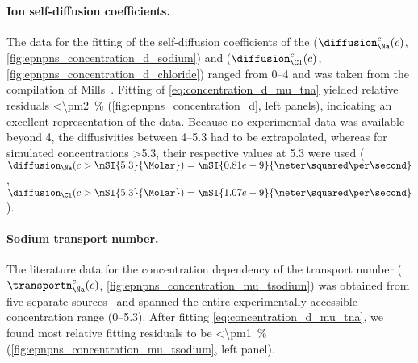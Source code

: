 \paragraph{Ion self-diffusion coefficients.}
%
The data for the fitting of the self-diffusion coefficients of the \Na{} ($\diffusion_{\Na}^c (c)$,
\cref{fig:epnpns_concentration_d_sodium}) and \Cl{} ($\diffusion_{\Cl}^c (c)$,
\cref{fig:epnpns_concentration_d_chloride}) ranged from \SIrange{0}{4}{\Molar} and was taken from the
compilation of Mills~\cite{Mills-1989}. Fitting of \cref{eq:concentration_d_mu_tna} yielded relative residuals
\SI{<\pm2}{\percent} (\cref{fig:epnpns_concentration_d}, left panels), indicating an excellent representation
of the data. Because no experimental data was available beyond \SI{4}{\Molar}, the diffusivities between
\SIrange{4}{5.3}{\Molar} had to be extrapolated, whereas for simulated concentrations \SI{>5.3}{\Molar}, their
respective values at \SI{5.3}{\Molar} were used (\ie~$\diffusion_{\Na} (c > \mSI{5.3}{\Molar}) =
\mSI{0.81e-9}{\meter\squared\per\second}$, $\diffusion_{\Cl} (c > \mSI{5.3}{\Molar}) =
\mSI{1.07e-9}{\meter\squared\per\second}$).

\paragraph{Sodium transport number.}
%
The literature data for the concentration dependency of the \Na{} transport number ($\transportn_{\Na}^c (c)$,
\cref{fig:epnpns_concentration_mu_tsodium}) was obtained from five separate
sources~\cite{Esteso-1976,Haynes-2017,DellaMonica-1979,Panopoulos-1986,Schonert-2013} and spanned the entire
experimentally accessible  concentration range (\SIrange{0}{5.3}{\Molar}). After fitting
\cref{eq:concentration_d_mu_tna}, we found most relative fitting residuals to be \SI{<\pm1}{\percent}
(\cref{fig:epnpns_concentration_mu_tsodium}, left panel).

